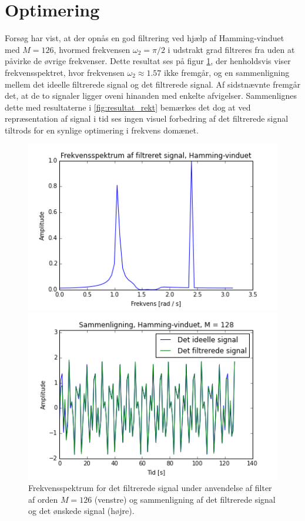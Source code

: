\section{Optimering}
Forsøg har vist, at der opnås en god filtrering ved hjælp af Hamming-vinduet med $M=126$, hvormed frekvensen $\omega_2 = \pi/2$ i udstrakt grad filtreres fra uden at påvirke de øvrige frekvenser. Dette resultat ses på figur \ref{fig:resultat}, der henholdsvis viser frekvensspektret, hvor frekvensen $\omega_2 \approx 1.57$ ikke fremgår, og en sammenligning mellem det ideelle filtrerede signal og det filtrerede signal. Af sidstnævnte fremgår det, at de to signaler ligger oveni hinanden med enkelte afvigelser. Sammenlignes dette med resultaterne i \ref{fig:resultat_rekt} bemærkes det dog at ved repræsentation af signal i tid ses ingen visuel forbedring af det filtrerede signal tiltrods for en synlige optimering i frekvens domænet. 
\begin{figure}[H]
\begin{minipage}{0.49\textwidth}
\centering
\includegraphics[width=\textwidth]{figures/Filter/freq_filt_signal_Hamming.png}
\end{minipage}
\begin{minipage}{0.49\textwidth}
\centering
\includegraphics[width=\textwidth]{figures/Filter/signal_compare_Hamming.png}
\end{minipage}
\caption{Frekvensspektrum for det filtrerede signal under anvendelse af filter af orden $M=126$ (venstre) og sammenligning af det filtrerede signal og det ønskede signal (højre).}
\label{fig:resultat}
\end{figure}

